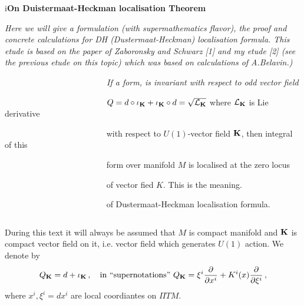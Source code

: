 
\def\vare {\varepsilon}
\def\A {{\bf A}}
\def\FF {{\bf F}}
\def\a {\alpha}
\def\K {{\bf K}}
\def\s {{\sigma}}
\def\p{\partial}
\def\vare{{\varepsilon}}
\def\L {{\cal L}}
\def\G {{\Gamma}}
\def\C {{\bf C}}
\def\Z {{\bf Z}}
\def\U  {{\cal U}}
\def\R  {{\bf R}}
\def\E  {{\bf E}}
\def\l {\lambda}
\def\degree {{\bf {\rm degree}\,\,}}
\def \finish {${\,\,\vrule height1mm depth2mm width 8pt}$}
\def \m {\medskip}
\def\r {{\bf r}}
\def\v {{\bf v}}
\def\n {{\bf n}}
\def\b {{\bf b}}
\def\ss  {{\bf s }}
\def\e{{\bf e}}
\def\ac {{\bf a}}
\def \X   {{\bf X}}
\def \Y   {{\bf Y}}
\def \x   {{\bf x}}
\def \y   {{\bf y}}
\def\w {{\omega}} 
\def\wv {{\buildrel \rightarrow\over \omega}}

\def\K{{\bf K}}
\def\locus {\hbox{locus of $\K$}}


\centerline {i\bf On Duistermaat-Heckman localisation Theorem}

  \bigskip
{\it
   Here we will give a formulation (with supermathematics flavor),
the proof and concrete calculations
for DH (Dustermaat-Heckman) localisation formula. This etude is based
on the paper of  Zaboronsky and Schwarz [1] and my etude
[2] (see the previous etude on this topic) which was based on calculations 
of A.Belavin.)
}

      \medskip
{\sl
  $\qquad\qquad$$\qquad\qquad$$\qquad\qquad$ If a form, 
  is invariant with respect to odd vector field


$\qquad\qquad$$\qquad\qquad$$\qquad\qquad$  
  $Q=d\circ \iota_\K+\iota_\K\circ d=\sqrt {\L_\K}$ 
   where $\L_\K$ is Lie derivative 

$\qquad\qquad$$\qquad\qquad$$\qquad\qquad$ with respect
 to $U(1)$-vector field $\K$, then integral of this 

$\qquad\qquad$$\qquad\qquad$$\qquad\qquad$ form over manifold
  $M$ is localised at the zero locus 

$\qquad\qquad$$\qquad\qquad$$\qquad\qquad$ of vector fied $K$. This is the
 meaning.

$\qquad\qquad$$\qquad\qquad$$\qquad\qquad$ 
of Dustermaat-Heckman localisation formula.

}
 $$ $$

   During this text it will always be assumed that
$M$ is compact manifold  and $\K$ is compact vector field on it, 
i.e. vector field which generates $U(1)$
action. We denote by $$
   Q_\K=d+\iota_\K\,,\quad \hbox
 {in ``supernotations''}\,\,
Q_\K=\xi^i{\p\over \p x^i}+K^i(x){\p \over \p \xi^i}\,,
              $$
where $x^i,\xi^i=dx^i$ are local coordiantes on $\Pi TM$.


